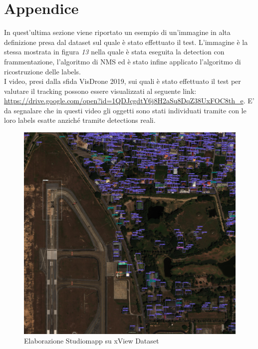 \section{Appendice}
In quest'ultima sezione viene riportato un esempio di un'immagine in alta definizione presa dal dataset sul quale è stato effettuato il test. L'immagine è la stessa mostrata in figura \textit{13} nella quale è stata eseguita la detection con frammentazione, l'algoritmo di NMS ed è stato infine applicato l'algoritmo di ricostruzione delle labels.\\

I video, presi dalla sfida VisDrone 2019, sui quali è stato effettuato il test per valutare il tracking possono essere visualizzati al seguente link: \url{https://drive.google.com/open?id=1QDJcgdtY6j8H2aSu8DqZ38UxFOC8th_e}. E' da segnalare che in questi video gli oggetti sono stati individuati tramite con le loro labels esatte anziché tramite detections reali.

\begin{figure}[H]
	\centering
	\includegraphics[width=\linewidth]{images/immagine-satellite-detection.jpg}
	\caption{Elaborazione Studiomapp su xView Dataset}
	\label{esempio di immagine con detection e frammentazione}
\end{figure}